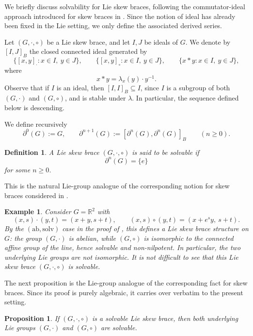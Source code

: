 \documentclass[reqno]{amsart}
\newtheorem{definition}[theorem]{Definition}
\newtheorem{proposition}[theorem]{Proposition}
\newtheorem{example}[theorem]{Example}
\newcommand{\brd}[2]{\left[#1,#2\right]_{\cdot}}
\newcommand{\brc}[2]{\left[#1,#2\right]_{\circ}}
\begin{document}
We briefly discuss solvability for Lie skew braces, following the
commutator-ideal approach introduced for skew braces in \cite{BBEJP}. Since the
notion of ideal has already been fixed in the Lie setting, we only define the
associated derived series.

Let \((G,\cdot,\circ)\) be a Lie skew brace, and let \(I,J\) be ideals of
\(G\). We denote by \([I,J]_B\) the closed connected ideal generated by
\[
\{\brd{x}{y}:x\in I,\ y\in J\},\qquad
\{\brc{x}{y}:x\in I,\ y\in J\},\qquad
\{x*y:x\in I,\ y\in J\},
\]
where
\[
x*y=\lambda_x(y)\cdot y^{-1}.
\]
Observe that if \(I\) is an ideal, then \([I,I]_B\subseteq I\), since \(I\) is
a subgroup of both \((G,\cdot)\) and \((G,\circ)\), and is stable under
\(\lambda\). In particular, the sequence defined below is descending.

We define recursively
\[
\partial^0(G):=G,\qquad
\partial^{n+1}(G):=[\partial^n(G),\partial^n(G)]_B
\qquad (n\ge 0).
\]

\begin{definition}
A Lie skew brace \((G,\cdot,\circ)\) is said to be \emph{solvable} if
\[
\partial^n(G)=\{e\}
\]
for some \(n\ge 0\).
\end{definition}

This is the natural Lie-group analogue of the corresponding notion for skew
braces considered in \cite[Def.~16, Def.~18]{BBEJP}.

\begin{example}\rm
Consider \(G=\mathbb R^2\) with
\[
(x,s)\cdot (y,t)=(x+y,s+t),
\qquad
(x,s)\circ (y,t)=(x+e^{s}y,\ s+t).
\]
By the \((\mathrm{ab},\mathrm{solv})\) case in the proof of
\cite[Thm.~1.4]{DameleLoi2026}, this defines a Lie skew brace structure on
\(G\): the group \((G,\cdot)\) is abelian, while \((G,\circ)\) is isomorphic to
the connected affine group of the line, hence solvable and non-nilpotent. In
particular, the two underlying Lie groups are not isomorphic. It is not
difficult to see that this Lie skew brace \((G,\cdot,\circ)\) is solvable.
\end{example}

The next proposition is the Lie-group analogue of the corresponding fact for
skew braces. Since its proof is purely algebraic, it carries over verbatim to
the present setting.

\begin{proposition}\label{prop:solvable-LSB-implies-solvable-groups}
If $(G,\cdot,\circ)$ is a solvable Lie skew brace, then both underlying Lie
groups $(G,\cdot)$ and $(G,\circ)$ are solvable.
\end{proposition}
\end{document}
